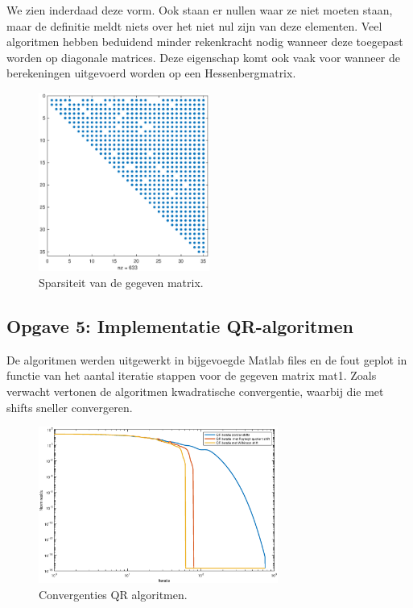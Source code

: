 \documentclass[a4paper]{article}
\newcommand{\opgave}[1]{\subsection{Opgave #1}}
\begin{document}
We zien inderdaad deze vorm. Ook staan er nullen waar ze niet moeten staan, maar de definitie meldt niets over het niet nul zijn van deze elementen. Veel algoritmen hebben beduidend minder rekenkracht nodig wanneer deze toegepast worden op diagonale matrices. Deze eigenschap komt ook vaak voor wanneer de berekeningen uitgevoerd worden op een Hessenbergmatrix.
\begin{figure}[H]
	\begin{center} 
		\includegraphics[width=0.5\textwidth]{spy.eps}
	\end{center}
	\caption{Sparsiteit van de gegeven matrix.}
	\label{fig:spy}
\end{figure}
\newpage

\opgave{5: Implementatie QR-algoritmen}\label{sec:oef5}
De algoritmen werden uitgewerkt in bijgevoegde Matlab files en de fout geplot in functie van het aantal iteratie stappen voor de gegeven matrix mat1. Zoals verwacht vertonen de algoritmen kwadratische convergentie, waarbij die met shifts sneller convergeren.

\begin{figure}[H]
	\begin{center} 
		\includegraphics[width=0.7\textwidth]{opgave5.eps}
	\end{center}
	\caption{Convergenties QR algoritmen.}
	\label{fig:QR}
\end{figure}
\end{document}
